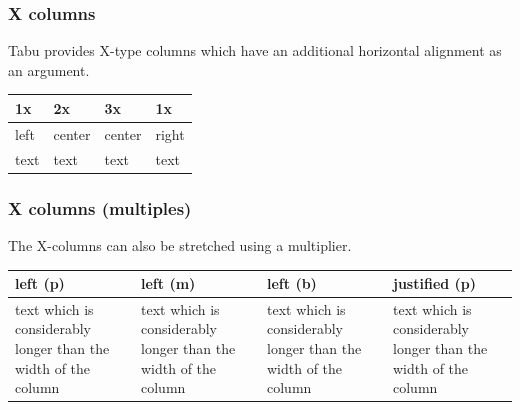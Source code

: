 \subsubsection{X columns}

Tabu provides X-type columns which have an additional horizontal alignment as an argument.

%

\begin{filecontents*}{\democodefile}
\begin{center}
\small\sffamily\renewcommand{\arraystretch}{1.4}  
\begin{tabu}  to  0.6\textwidth
{|X[1,l]|X[2,c]|X[3,c]|X[1,r]|}
\hline
1x    &  2x     &  3x     &  1x    \\ \hline
left  &  center &  center &  right \\ \hline
text  &  text   &  text   &  text  \\ \hline
\end{tabu}
\end{center}	
\end{filecontents*}

\subsubsection{X columns (multiples)}
The X-columns can also be stretched using a multiplier.

%


\begin{filecontents*}{\democodefile}
\begin{center}
\small\sffamily\renewcommand{\arraystretch}{1.4}  
\begin{tabu}  to  0.9\textwidth{|X[2,Lp]|X[2,Cm]|X[2,Rb]|X[2,J]|}
\hline
left  (p)  &  left  (m)  &  left  (b)  &  justified  (p)  \\  \hline
text which is considerably longer than the width of the column &
text which is considerably longer than the width of the column &
text which is considerably longer than the width of the column &
text which is considerably longer than the width of the column \\
\hline
\end{tabu}
\end{center}	
\end{filecontents*}

